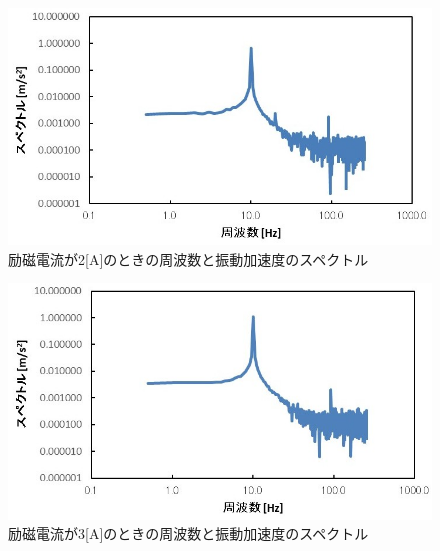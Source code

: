 \documentclass[a4paper,10.5pt]{jsarticle}
\begin{document}
\newpage
\begin{figure}[h]
  \centering
  \includegraphics[width=14cm]{9.png}
  \caption{励磁電流が2[A]のときの周波数と振動加速度のスペクトル}
\end{figure}
\begin{figure}[h]
  \centering
  \includegraphics[width=14cm]{10.png}
  \caption{励磁電流が3[A]のときの周波数と振動加速度のスペクトル}
\end{figure}
\newpage
\end{document}
